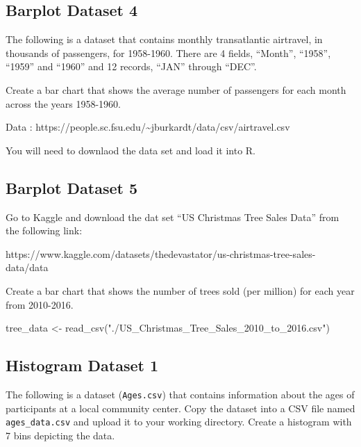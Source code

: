 \documentclass[
  letterpaper,
  DIV=11,
  numbers=noendperiod]{scrreprt}
\newenvironment{Shaded}{\begin{snugshade}}{\end{snugshade}}
\newcommand{\FunctionTok}[1]{\textcolor[rgb]{0.28,0.35,0.67}{#1}}
\newcommand{\NormalTok}[1]{\textcolor[rgb]{0.00,0.23,0.31}{#1}}
\newcommand{\OtherTok}[1]{\textcolor[rgb]{0.00,0.23,0.31}{#1}}
\newcommand{\StringTok}[1]{\textcolor[rgb]{0.13,0.47,0.30}{#1}}
\begin{document}
\subsection*{Barplot Dataset 4}\label{barplot-dataset-4}

The following is a dataset that contains monthly transatlantic
airtravel, in thousands of passengers, for 1958-1960. There are 4
fields, ``Month'', ``1958'', ``1959'' and ``1960'' and 12 records,
``JAN'' through ``DEC''.

Create a bar chart that shows the average number of passengers for each
month across the years 1958-1960.

Data :
https://people.sc.fsu.edu/\textasciitilde jburkardt/data/csv/airtravel.csv

You will need to downlaod the data set and load it into R.

\subsection*{Barplot Dataset 5}\label{barplot-dataset-5}

Go to Kaggle and download the dat set ``US Christmas Tree Sales Data''
from the following link:

https://www.kaggle.com/datasets/thedevastator/us-christmas-tree-sales-data/data

Create a bar chart that shows the number of trees sold (per million) for
each year from 2010-2016.

\begin{Shaded}
\begin{Highlighting}[]
\NormalTok{tree\_data }\OtherTok{\textless{}{-}} \FunctionTok{read\_csv}\NormalTok{(}\StringTok{"./US\_Christmas\_Tree\_Sales\_2010\_to\_2016.csv"}\NormalTok{)}
\end{Highlighting}
\end{Shaded}

\subsection*{Histogram Dataset 1}\label{histogram-dataset-1}

The following is a dataset (\texttt{Ages.csv}) that contains information
about the ages of participants at a local community center. Copy the
dataset into a CSV file named \texttt{ages\_data.csv} and upload it to
your working directory. Create a histogram with 7 bins depicting the
data.
\end{document}
